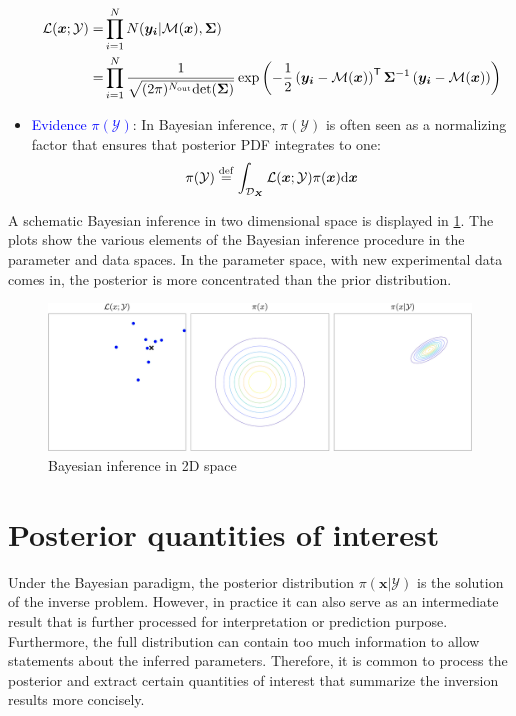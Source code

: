\begin{itemize}[left=0pt]
        \begin{equation}        
        \label{eq: Likelihood function}
        \begin{aligned}
         \mathcal{L}(\boldsymbol{x};\mathcal{Y}) =& \prod_{i=1}^{N} N(\boldsymbol{y_{i}}|\mathcal{M}(\boldsymbol{x}),\boldsymbol{\Sigma}) \\
         =& \prod_{i=1}^{N}\frac{1}{\sqrt{(2 \pi)^{N_{\rm{out}}}{\rm{det}} 
         (\boldsymbol{\Sigma})}}\exp\left(-\frac{1}{2}\left(\boldsymbol{y_i} - \mathcal{M}(\boldsymbol{x})\right)^{\mathsf{T}} \boldsymbol{\Sigma}^{-1}\left(\boldsymbol{y_i} - \mathcal{M}(\boldsymbol{x})\right)\right) 
        \end{aligned}
        \end{equation} 
    \item \textcolor{blue}{Evidence $\pi(\mathcal{Y})$}: In Bayesian inference, $\pi(\mathcal{Y})$ is often seen as a normalizing factor that ensures that posterior \acrshort{PDF} integrates to one:
    \begin{equation}
        \label{eq: evidence}
        \pi(\mathcal{Y}) \stackrel{\rm{def}}{=} \int_{\mathcal{D}_{\boldsymbol{X}}} 
        {\mathcal{L}(\boldsymbol{x};\mathcal{Y}) \pi(\boldsymbol{x})}
        {\rm{d}} \boldsymbol{x}
    \end{equation}
\end{itemize}

A schematic Bayesian inference in two dimensional space is displayed in \cref{fig: BI_2D}. The plots show the various elements of the Bayesian inference procedure in the parameter and data spaces. In the parameter space, with new experimental data comes in, the posterior is more concentrated than the prior distribution. 
\begin{figure}[htbp]
    \centering
    \includegraphics[width = 140mm]{Figures/figure-BI_2D.pdf}
    \caption{Bayesian inference in 2D space}
    \label{fig: BI_2D}
\end{figure}
\section{Posterior quantities of interest}
Under the Bayesian paradigm, the posterior distribution $\pi(\boldsymbol{x}|\mathcal{Y})$ is the solution of the inverse problem. However, in practice it can also serve as an intermediate result that is further processed for interpretation or prediction purpose. Furthermore, the full distribution can contain too much information to allow statements about the inferred parameters. Therefore, it is common to process the posterior and extract certain quantities of interest that summarize the inversion results more concisely.


